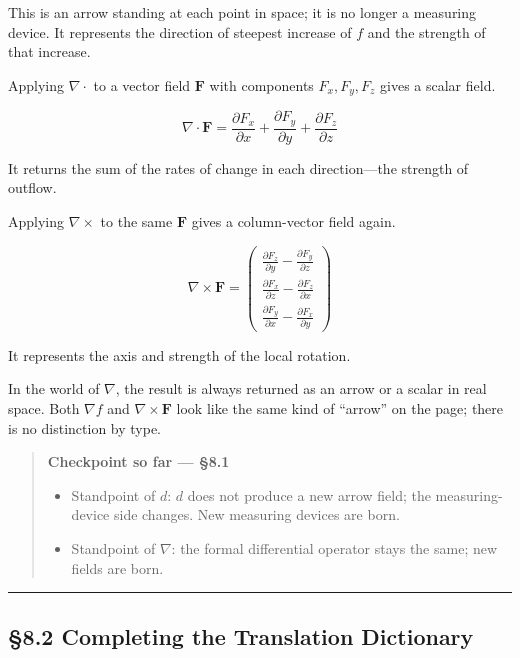This is an arrow standing at each point in space; it is no longer a
measuring device. It represents the direction of steepest increase of
\(f\) and the strength of that increase.

Applying \(\nabla\cdot\) to a vector field \(\mathbf{F}\) with
components \(F_x,F_y,F_z\) gives a scalar field.

\[\nabla \cdot \mathbf{F} = \frac{\partial F_x}{\partial x} + \frac{\partial F_y}{\partial y} + \frac{\partial F_z}{\partial z}\]

It returns the sum of the rates of change in each direction---the
strength of outflow.

Applying \(\nabla\times\) to the same \(\mathbf{F}\) gives a
column-vector field again.

\[\nabla \times \mathbf{F} = \begin{pmatrix} \frac{\partial F_z}{\partial y} - \frac{\partial F_y}{\partial z} \\[0.3em] \frac{\partial F_x}{\partial z} - \frac{\partial F_z}{\partial x} \\[0.3em] \frac{\partial F_y}{\partial x} - \frac{\partial F_x}{\partial y} \end{pmatrix}\]

It represents the axis and strength of the local rotation.

In the world of \(\nabla\), the result is always returned as an arrow or
a scalar in real space. Both \(\nabla f\) and \(\nabla\times\mathbf{F}\)
look like the same kind of ``arrow'' on the page; there is no
distinction by type.

\begin{quote}
\textbf{Checkpoint so far — §8.1}

\begin{itemize}
\item
  Standpoint of \(d\): \(d\) does not produce a new arrow field; the
  measuring-device side changes. New measuring devices are born.
\item
  Standpoint of \(\nabla\): the formal differential operator stays the
  same; new fields are born.
\end{itemize}
\end{quote}

\begin{center}\rule{0.5\linewidth}{0.5pt}\end{center}

\hypertarget{completing-the-translation-dictionary}{%
\subsection{§8.2 Completing the Translation
Dictionary}\label{completing-the-translation-dictionary}}

